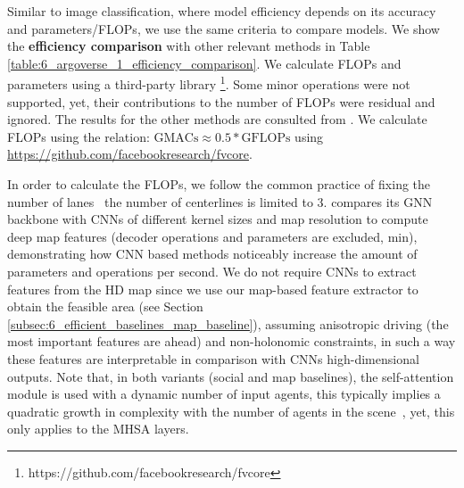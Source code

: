 Similar to image classification, where model efficiency depends on its accuracy and parameters/FLOPs, we use the same criteria to compare models. We show the \textbf{efficiency comparison} with other relevant methods in Table \ref{table:6_argoverse_1_efficiency_comparison}. We calculate FLOPs and parameters using a third-party library \footnote{https://github.com/facebookresearch/fvcore}. Some minor operations were not supported, yet, their contributions to the number of FLOPs were residual and ignored. 
The results for the other methods are consulted from \cite{gilles2021home} \cite{gilles2022gohome} \cite{gao2020vectornet} \cite{he2022multi}. We calculate FLOPs using the relation: $\text{GMACs} \approx 0.5 * \text{GFLOPs}$ using \url{https://github.com/facebookresearch/fvcore}.

In order to calculate the FLOPs, we follow the common practice \cite{gao2020vectornet} \cite{gu2021densetnt} \cite{gilles2022gohome} of fixing the number of lanes \ie \ the number of centerlines is limited to 3. %
%
\cite{gao2020vectornet} compares its GNN backbone with CNNs of different kernel sizes and map resolution to compute deep map features (decoder operations and parameters are excluded, min), demonstrating how CNN based methods noticeably increase the amount of parameters and operations per second. We do not require CNNs to extract features from the HD map since we use our map-based feature extractor to obtain the feasible area (see Section \ref{subsec:6_efficient_baselines_map_baseline}), assuming anisotropic driving (the most important features are ahead) and non-holonomic constraints, in such a way these features are interpretable in comparison with CNNs high-dimensional outputs. Note that, in both variants (social and map baselines), the self-attention module is used with a dynamic number of input agents, this typically implies a quadratic growth in complexity with the number of agents in the scene~\cite{vaswani2017attention}, yet, this only applies to the MHSA layers.

